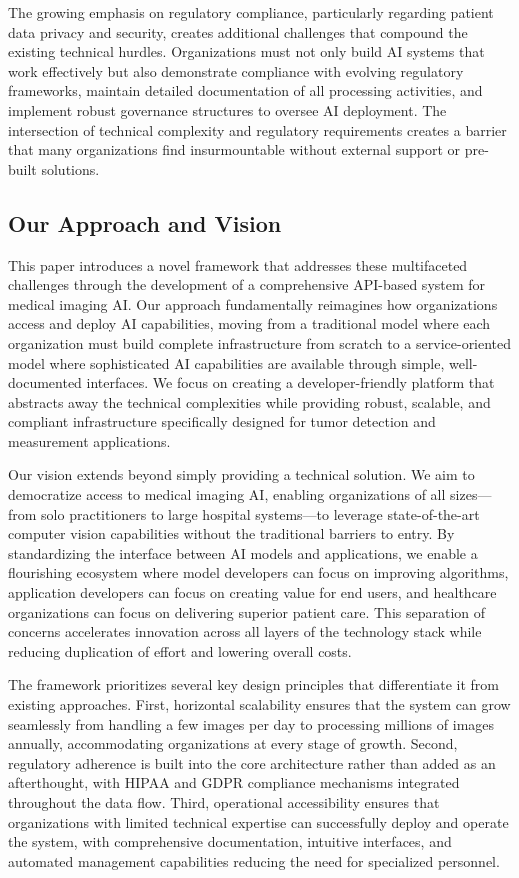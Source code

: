\documentclass[12pt,a4paper]{article}
\begin{document}
The growing emphasis on regulatory compliance, particularly regarding patient data privacy and security, creates additional challenges that compound the existing technical hurdles. Organizations must not only build AI systems that work effectively but also demonstrate compliance with evolving regulatory frameworks, maintain detailed documentation of all processing activities, and implement robust governance structures to oversee AI deployment. The intersection of technical complexity and regulatory requirements creates a barrier that many organizations find insurmountable without external support or pre-built solutions.

\subsection{Our Approach and Vision}

This paper introduces a novel framework that addresses these multifaceted challenges through the development of a comprehensive API-based system for medical imaging AI. Our approach fundamentally reimagines how organizations access and deploy AI capabilities, moving from a traditional model where each organization must build complete infrastructure from scratch to a service-oriented model where sophisticated AI capabilities are available through simple, well-documented interfaces. We focus on creating a developer-friendly platform that abstracts away the technical complexities while providing robust, scalable, and compliant infrastructure specifically designed for tumor detection and measurement applications.

Our vision extends beyond simply providing a technical solution. We aim to democratize access to medical imaging AI, enabling organizations of all sizes—from solo practitioners to large hospital systems—to leverage state-of-the-art computer vision capabilities without the traditional barriers to entry. By standardizing the interface between AI models and applications, we enable a flourishing ecosystem where model developers can focus on improving algorithms, application developers can focus on creating value for end users, and healthcare organizations can focus on delivering superior patient care. This separation of concerns accelerates innovation across all layers of the technology stack while reducing duplication of effort and lowering overall costs.

The framework prioritizes several key design principles that differentiate it from existing approaches. First, horizontal scalability ensures that the system can grow seamlessly from handling a few images per day to processing millions of images annually, accommodating organizations at every stage of growth. Second, regulatory adherence is built into the core architecture rather than added as an afterthought, with HIPAA and GDPR compliance mechanisms integrated throughout the data flow. Third, operational accessibility ensures that organizations with limited technical expertise can successfully deploy and operate the system, with comprehensive documentation, intuitive interfaces, and automated management capabilities reducing the need for specialized personnel.
\end{document}
